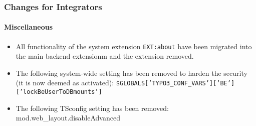 %

\begin{frame}[fragile]
	\frametitle{Changes for Integrators}
	\framesubtitle{Miscellaneous}

	\begin{itemize}
		\item All functionality of the system extension \texttt{EXT:about}
			have been migrated into the main backend extensionm and the
			extension removed.
		\item The following system-wide setting has been removed to harden the security
			(it is now deemed as activated):\newline
			\small\texttt{\$GLOBALS['TYPO3\_CONF\_VARS']['BE']['lockBeUserToDBmounts']}\normalsize
		\item The following TSconfig setting has been removed:\newline
			\small{mod.web\_layout.disableAdvanced}
	\end{itemize}

\end{frame}

